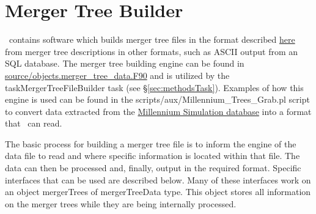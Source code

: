\section{Merger Tree Builder}\label{sec:MergerTreeBuilder}

\glc\ contains software which builds merger tree files in the format described \href{https://github.com/galacticusorg/galacticus/wiki/Merger-Tree-File-Format}{here} from merger tree descriptions in other formats, such as ASCII output from an SQL database. The merger tree building engine can be found in \hyperlink{objects.merger_tree_data.F90}{{\normalfont \ttfamily source/objects.merger\_tree\_data.F90}} and is utilized by the {\normalfont \ttfamily taskMergerTreeFileBuilder} task (see \S\ref{sec:methodsTask}). Examples of how this engine is used can be found in the {\normalfont \ttfamily scripts/aux/Millennium\_Trees\_Grab.pl} script to convert data extracted from the \href{http://www.g-vo.org/MyMillennium3/}{Millennium Simulation database} into a format that \glc\ can read.

The basic process for building a merger tree file is to inform the engine of the data file to read and where specific information is located within that file. The data can then be processed and, finally, output in the required format. Specific interfaces that can be used are described below. Many of these interfaces work on an object {\normalfont \ttfamily mergerTrees} of {\normalfont \ttfamily mergerTreeData} type. This object stores all information on the merger trees while they are being internally processed.

